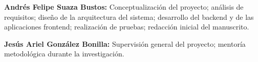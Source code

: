 \textbf{Andrés Felipe Suaza Bustos:} Conceptualización del proyecto; análisis de requisitos; diseño de la arquitectura del sistema; desarrollo del backend y de las aplicaciones frontend; realización de pruebas; redacción inicial del manuscrito.

\textbf{Jesús Ariel González Bonilla:} Supervisión general del proyecto; mentoría metodológica durante la investigación.

